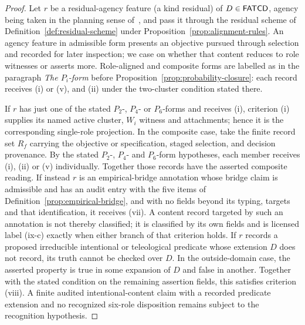 \begin{proof}
Let \(r\) be a residual-agency feature (a kind residual) of
\(D \in \mathsf{FATCD}{}\), agency being taken in the planning sense
of~\citet{Bratman1987}, and pass it through the residual scheme of
Definition~\ref{def:residual-scheme} under
Proposition~\ref{prop:alignment-rules}. An agency feature in admissible
form presents an objective pursued through selection and recorded for
later inspection; we case on whether that content reduces to role
witnesses or asserts more. Role-aligned and composite forms are labelled as in the paragraph
\emph{The \(P_i\)-form} before Proposition~\ref{prop:probability-closure}: each
record receives (i) or (v), and (ii) under the two-cluster condition stated
there.

If \(r\) has just one of the stated \(P_2\)-, \(P_4\)- or \(P_6\)-forms and
receives (i), criterion (i) supplies its named active cluster, \(W_i\)
witness and attachments; hence it is the corresponding single-role
projection. In the composite case, take the finite record set \(R_f\) carrying
the objective or specification, staged selection, and decision
provenance. By the stated \(P_2\)-, \(P_4\)- and \(P_6\)-form
hypotheses, each member receives (i), (ii) or (v) individually.
Together those records have the asserted composite reading. If instead \(r\) is an empirical-bridge annotation whose bridge claim is admissible and has an
audit entry with the five items of Definition~\ref{prop:empirical-bridge}, and with
no fields beyond its typing, targets and that identification, it
receives (vii). A content record targeted by such an annotation is not thereby classified; it is classified by its own fields and is licensed label (ix-c) exactly when either branch of that criterion holds. If \(r\) records a
proposed irreducible intentional or teleological predicate whose extension
\(D\) does not record, its truth cannot be checked over \(D\). In the outside-domain case, the asserted property is true in some
expansion of \(D\) and false in another. Together with the stated
condition on the remaining assertion fields, this satisfies
criterion (viii). A finite audited intentional-content claim with a recorded
predicate extension and no recognized six-role disposition remains subject to
the recognition hypothesis.


\end{proof}
